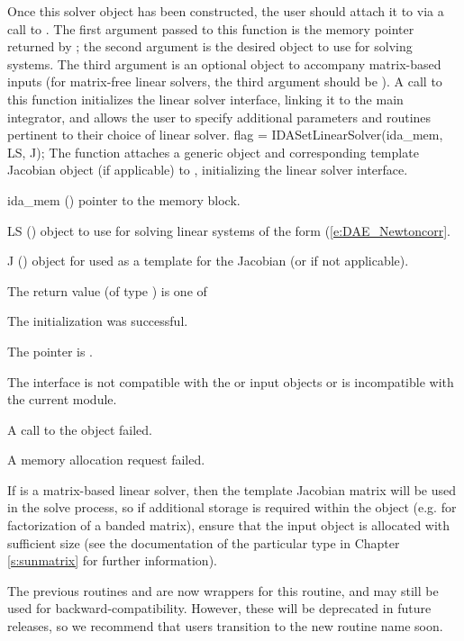 Once this solver object has been constructed, the user should attach
it to {\ida} via a call to .  The first argument
passed to this function is the {\ida} memory pointer returned by
; the second argument is the desired {\sunlinsol} object
to use for solving systems.  The third argument is an optional
{\sunmatrix} object to accompany matrix-based {\sunlinsol} inputs (for
matrix-free linear solvers, the third argument should be ).
A call to this function initializes the {\idals} linear solver
interface, linking it to the main {\ida} integrator, and allows the
user to specify additional parameters and routines pertinent to their
choice of linear solver.
{
  flag = IDASetLinearSolver(ida\_mem, LS, J);
}
{
  The function  attaches a generic {\sunlinsol}
  object  and corresponding template Jacobian {\sunmatrix}
  object  (if applicable) to {\ida}, initializing the {\idals}
  linear solver interface.
}
{
  \begin{args}
  \item[ida\_mem] ()
    pointer to the {\ida} memory block.
  \item[LS] ()
    {\sunlinsol} object to use for solving linear systems of the form
    (\ref{e:DAE_Newtoncorr}.
  \item[J] ()
    {\sunmatrix} object for used as a template for the Jacobian (or
     if not applicable).
  \end{args}
}
{
  The return value  (of type ) is one of
  \begin{args}
  \item[\Id{IDALS\_SUCCESS}]
    The {\idals} initialization was successful.
  \item[\Id{IDALS\_MEM\_NULL}]
    The  pointer is .
  \item[\Id{IDALS\_ILL\_INPUT}]
    The {\idals} interface is not compatible with the  or
     input objects or is incompatible with the current
    {\nvector} module.
  \item[\Id{IDALS\_SUNLS\_FAIL}]
    A call to the  object failed.
  \item[\Id{IDALS\_MEM\_FAIL}]
    A memory allocation request failed.
  \end{args}
}
{
  If  is a matrix-based linear solver, then the template
  Jacobian matrix  will be used in the solve process, so if
  additional storage is required within the {\sunmatrix} object
  (e.g. for factorization of a banded matrix), ensure that the input
  object is allocated with sufficient size (see the documentation of
  the particular {\sunmatrix} type in Chapter \ref{s:sunmatrix} for
  further information).

  The previous routines  and
   are now wrappers for this routine, and may
  still be used for backward-compatibility.  However, these will be
  deprecated in future releases, so we recommend that users transition
  to the new routine name soon.
}
